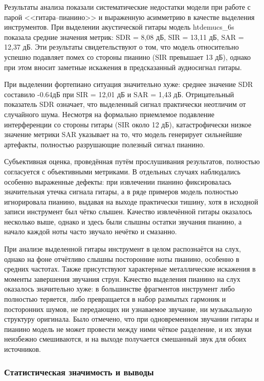 \documentclass[14pt]{extarticle}
\begin{document}
Результаты анализа показали систематические недостатки модели при работе с парой <<гитара--пианино>> и выраженную асимметрию в 
качестве выделения инструментов.
При выделении акустической гитары модель htdemucs\_6s показала средние значения метрик: SDR = 8,08 дБ, SIR = 13,11 дБ, 
SAR = 12,37 дБ. Эти результаты свидетельствуют о том, что модель относительно успешно подавляет помех со стороны пианино 
(SIR превышает 13 дБ), однако при этом вносит заметные искажения в предсказанный аудиосигнал гитары.

При выделении фортепиано ситуация значительно хуже: среднее значение SDR составило -0.64дБ при SIR = 12,01 дБ и SAR = 1,43 дБ. 
Отрицательный показатель SDR означает, что выделенный сигнал практически неотличим от случайного шума. 
Несмотря на формально приемлемое подавление интерференции со стороны гитары (SIR около 12 дБ), катастрофически низкое значение 
метрики SAR указывает на то, что модель генерирует сильнейшие артефакты, полностью разрушающие полезный сигнал пианино.

Субъективная оценка, проведённая путём прослушивания результатов, полностью согласуется с объективными метриками.
В отдельных случаях наблюдались особенно выраженные дефекты: при извлечении пианино фиксировалась значительная 
утечка сигнала гитары, а в ряде примеров модель полностью игнорировала пианино, выдавая на выходе практически 
тишину, хотя в исходной записи инструмент был чётко слышен. 
Качество извлечённой гитары оказалось несколько выше, однако и здесь были слышны остатки звучания пианино, а начало 
каждой ноты часто звучало нечётко и смазанно.

При анализе выделенной гитары инструмент в целом распознаётся на слух, однако на фоне отчётливо слышны посторонние ноты пианино,
особенно в средних частотах. Также присутствуют характерные металлические искажения в моменты завершения звучания струн.
Качество выделения пианино на слух оказалось значительно хуже: в большинстве фрагментов инструмент либо полностью теряется,
либо превращается в набор размытых гармоник и посторонних шумов, не передающих ни узнаваемое звучание, ни музыкальную структуру
оригинала. Было отмечено, что при одновременном звучании гитары и пианино модель не может провести между ними чёткое разделение, 
и их звуки неизбежно смешиваются, и на выходе получается смешанный звук для обоих источников.

\subsubsection{Статистическая значимость и выводы}
\end{document}
